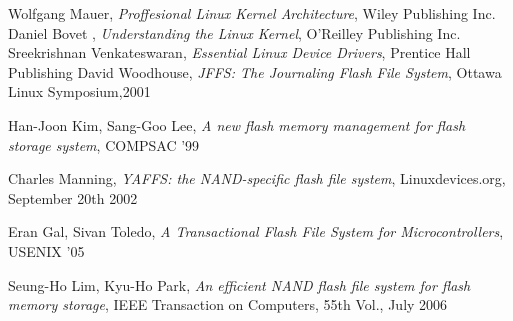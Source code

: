 \documentclass[conference]{IEEEtran}
\begin{document}

%
%
%
\begin{thebibliography}{1}
Wolfgang Mauer, \emph{Proffesional Linux Kernel Architecture},
Wiley Publishing Inc.
Daniel Bovet , \emph{Understanding the Linux Kernel},
O'Reilley Publishing Inc.
Sreekrishnan Venkateswaran, \emph{Essential Linux Device Drivers},
Prentice Hall Publishing
David Woodhouse, \emph{JFFS: The Journaling Flash File System},
Ottawa Linux Symposium,2001

Han-Joon Kim, Sang-Goo Lee, \emph{A new flash memory management
for flash storage system}, COMPSAC '99

Charles Manning, \emph{YAFFS: the NAND-specific flash file system},
Linuxdevices.org, September 20th 2002

Eran Gal, Sivan Toledo, \emph{A Transactional Flash File System for
Microcontrollers}, USENIX '05

Seung-Ho Lim, Kyu-Ho Park, \emph{An efficient NAND flash file
system for flash memory storage}, IEEE Transaction on Computers, 55th Vol.,
July 2006

\end{thebibliography}




\end{document}
